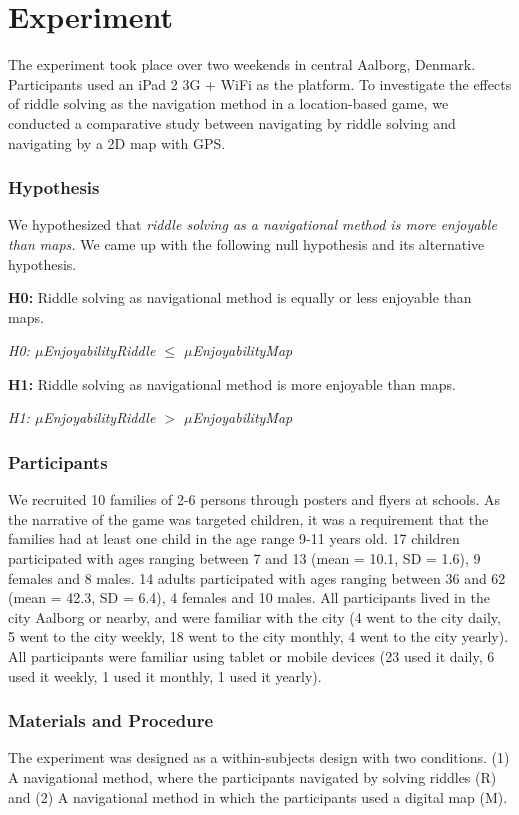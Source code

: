 \section{Experiment}
The experiment took place over two weekends in central Aalborg, Denmark. Participants used an iPad 2 3G + WiFi as the platform. To investigate the effects of riddle solving as the navigation method in a location-based game, we conducted a comparative study between navigating by riddle solving and navigating by a 2D map with GPS. 

\subsubsection{Hypothesis}
We hypothesized that \textit{riddle solving as a navigational method is more enjoyable than maps.} We came up with the following null hypothesis and its alternative hypothesis. 

\textbf{H0:} Riddle solving as navigational method is equally or less enjoyable than maps. 

\hspace{10 mm} \textit{H0: $\mu$EnjoyabilityRiddle $\leq$ $\mu$EnjoyabilityMap}

\textbf{H1:} Riddle solving as navigational method is more enjoyable than maps.

\hspace{10 mm} \textit{H1: $\mu$EnjoyabilityRiddle $>$ $\mu$EnjoyabilityMap}

\subsubsection{Participants}
We recruited 10 families of 2-6 persons through posters and flyers at schools. 
As the narrative of the game was targeted children, it was a requirement that the families had at least one child in the age range 9-11 years old. 17 children participated with ages ranging between 7 and 13 (mean = 10.1, SD = 1.6), 9 females and 8 males. 14 adults participated with ages ranging between 36 and 62 (mean = 42.3, SD = 6.4), 4 females and 10 males.  All participants lived in the city Aalborg or nearby, and were familiar with the city (4 went to the city daily, 5 went to the city weekly, 18 went to the city monthly, 4 went to the city yearly). All participants were familiar using tablet or mobile devices (23 used it daily, 6 used it weekly, 1 used it monthly, 1 used it yearly).

\subsubsection{Materials and Procedure}
The experiment was designed as a within-subjects design with two conditions. (1) A navigational method, where the participants navigated by solving riddles (R) and (2) A navigational method in which the participants used a digital map (M).

